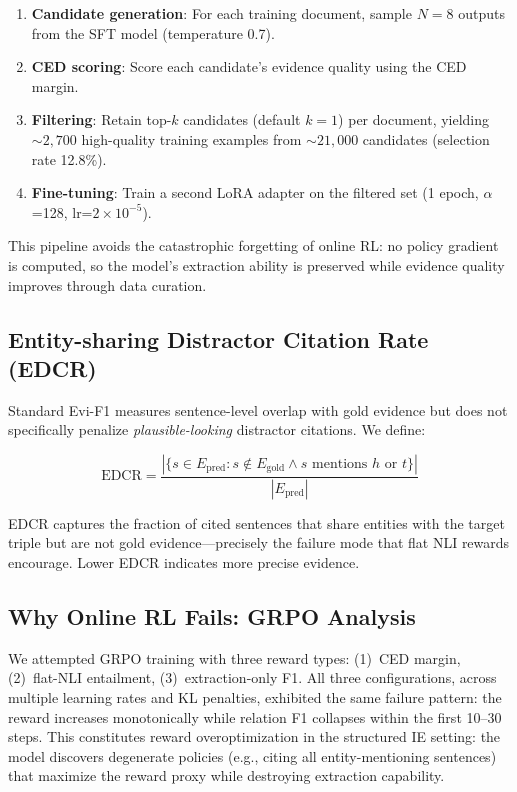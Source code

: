 \documentclass[11pt,a4paper]{article}
\newcommand{\edcr}{EDCR}
\begin{document}
\begin{enumerate}[nosep,leftmargin=*]
\item \textbf{Candidate generation}: For each training document, sample $N=8$ outputs from the SFT model (temperature 0.7).
\item \textbf{CED scoring}: Score each candidate's evidence quality using the CED margin.
\item \textbf{Filtering}: Retain top-$k$ candidates (default $k=1$) per document, yielding ${\sim}2{,}700$ high-quality training examples from ${\sim}21{,}000$ candidates (selection rate 12.8\%).
\item \textbf{Fine-tuning}: Train a second LoRA adapter on the filtered set (1 epoch, $\alpha$=128, lr=$2\times10^{-5}$).
\end{enumerate}

This pipeline avoids the catastrophic forgetting of online RL: no policy gradient is computed, so the model's extraction ability is preserved while evidence quality improves through data curation.

\subsection{Entity-sharing Distractor Citation Rate (\edcr{})}
\label{sec:edcr}

Standard Evi-F1 measures sentence-level overlap with gold evidence but does not specifically penalize \emph{plausible-looking} distractor citations. We define:

\begin{equation}
\text{EDCR} = \frac{|\{s \in E_\text{pred} : s \notin E_\text{gold} \wedge s \text{ mentions } h \text{ or } t\}|}{|E_\text{pred}|}
\end{equation}

EDCR captures the fraction of cited sentences that share entities with the target triple but are not gold evidence---precisely the failure mode that flat NLI rewards encourage. Lower EDCR indicates more precise evidence.

\subsection{Why Online RL Fails: GRPO Analysis}

We attempted GRPO training with three reward types: (1)~CED margin, (2)~flat-NLI entailment, (3)~extraction-only F1. All three configurations, across multiple learning rates and KL penalties, exhibited the same failure pattern: the reward increases monotonically while relation F1 collapses within the first 10--30 steps. This constitutes reward overoptimization in the structured IE setting: the model discovers degenerate policies (e.g., citing all entity-mentioning sentences) that maximize the reward proxy while destroying extraction capability.
\end{document}

